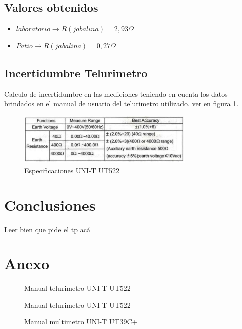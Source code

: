 \documentclass[12pt, letterpaper]{article}
\begin{document}
\subsection{Valores obtenidos}
\begin{itemize}
    \item $laboratorio \rightarrow R(jabalina)=2,93 \Omega$
    \item $Patio \rightarrow R(jabalina)=0,27 \Omega$
\end{itemize}

\subsection{Incertidumbre Telurimetro}
Calculo de incertidumbre en las mediciones teniendo en cuenta los datos brindados en el manual de usuario del telurimetro utilizado. ver en figura \ref{fig:epecificacion_telur}.
\begin{figure}[H]
	\centering
	\includegraphics[width=0.75\textwidth]{imagenes/especificaciones_telurimetro.png}
	\caption{Especificaciones UNI-T UT522}
	\label{fig:epecificacion_telur}
\end{figure}


\section{Conclusiones}

Leer bien que pide el tp acá

\newpage
\section{Anexo}

\begin{figure}[H]
    \centering
    
    \caption{Manual telurimetro UNI-T UT522}
    \label{fig:manual_UT522}
\end{figure}
\newpage
\begin{figure}[H]
    \centering
    
    \caption{Manual telurimetro UNI-T UT522}
\end{figure}
\newpage
\begin{figure}[H]
    \centering
    
    \caption{Manual multimetro UNI-T UT39C+}
    \label{fig:manual_UT39c}
\end{figure}

\label{LastPage}
\end{document}
